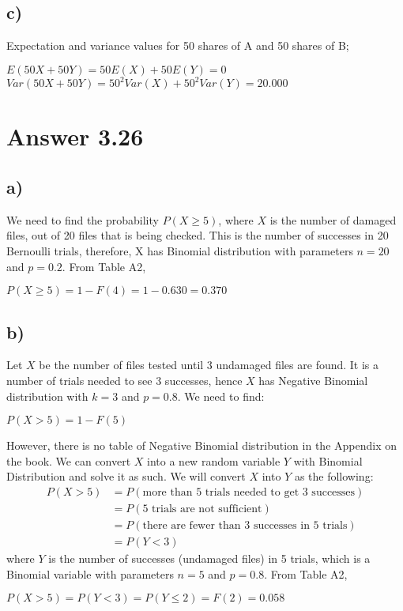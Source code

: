 \documentclass[12pt]{article}
\begin{document}
\subsection*{c)}
Expectation and variance values for 50 shares of A and 50 shares of B;
\begin{center}
$E(50X + 50Y) = 50E(X) + 50E(Y) = 0$\\$Var(50X + 50Y) = 50^2 Var(X) + 50^2 Var(Y) = 20.000$
\end{center}

\section*{Answer 3.26}

\subsection*{a)}
We need to find the probability $P(X \geq 5)$, where $X$ is the number of damaged files,
out of 20 files that is being checked. This is the number of successes in 20 Bernoulli trials, therefore, X has Binomial distribution with parameters $n = 20$ and $p = 0.2$. From Table A2,
\begin{center}
$P(X \geq 5) = 1 - F(4) = 1 - 0.630 = 0.370$
\end{center}

\subsection*{b)}
Let $X$ be the number of files tested until 3 undamaged files are found. It is a number of trials needed to see 3 successes, hence $X$ has Negative Binomial distribution with $k = 3$ and $p = 0.8$. We need to find: 
\begin{center}
$P(X > 5) = 1 - F(5)$
\end{center}
However, there is no table of Negative Binomial distribution in the Appendix on the book. We can convert $X$ into a new random variable $Y$ with Binomial Distribution and solve it as such. We will convert $X$ into $Y$ as the following: 
\begin{align*}
P(X > 5) &= P(\text{more than 5 trials needed to get 3 successes}) \\
&= P(\text{5 trials are not sufficient}) \\
&= P(\text{there are fewer than 3 successes in 5 trials}) \\
&= P(Y < 3)
\end{align*}
where $Y$ is the number of successes (undamaged files) in 5 trials, which is a Binomial variable with parameters $n = 5$ and $p = 0.8$. From Table A2,
\begin{center}
$P(X > 5) = P(Y < 3) = P(Y \leq 2) = F(2) = 0.058$
\end{center}
\end{document}

